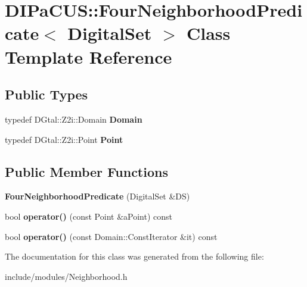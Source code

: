 \hypertarget{classDIPaCUS_1_1FourNeighborhoodPredicate}{}\section{D\+I\+Pa\+C\+US\+:\+:Four\+Neighborhood\+Predicate$<$ Digital\+Set $>$ Class Template Reference}
\label{classDIPaCUS_1_1FourNeighborhoodPredicate}
\subsection*{Public Types}
\begin{DoxyCompactItemize}
\item 
\mbox{\label{classDIPaCUS_1_1FourNeighborhoodPredicate_add681541cb1014a9835793a20f1fdb15}} 
typedef D\+Gtal\+::\+Z2i\+::\+Domain {\bfseries Domain}
\item 
\mbox{\label{classDIPaCUS_1_1FourNeighborhoodPredicate_aa8bcdc5d389e73ce8c00fc19a445dc3f}} 
typedef D\+Gtal\+::\+Z2i\+::\+Point {\bfseries Point}
\end{DoxyCompactItemize}
\subsection*{Public Member Functions}
\begin{DoxyCompactItemize}
\item 
\mbox{\label{classDIPaCUS_1_1FourNeighborhoodPredicate_a81d8a6e6b3b123564ec2d5e12a4c856e}} 
{\bfseries Four\+Neighborhood\+Predicate} (Digital\+Set \&DS)
\item 
\mbox{\label{classDIPaCUS_1_1FourNeighborhoodPredicate_ac52774d3f0242ef0dd65a4d4a9442eb7}} 
bool {\bfseries operator()} (const Point \&a\+Point) const
\item 
\mbox{\label{classDIPaCUS_1_1FourNeighborhoodPredicate_a9b943cc29cb49998401201384670060a}} 
bool {\bfseries operator()} (const Domain\+::\+Const\+Iterator \&it) const
\end{DoxyCompactItemize}


The documentation for this class was generated from the following file\+:\begin{DoxyCompactItemize}
\item 
include/modules/Neighborhood.\+h\end{DoxyCompactItemize}
